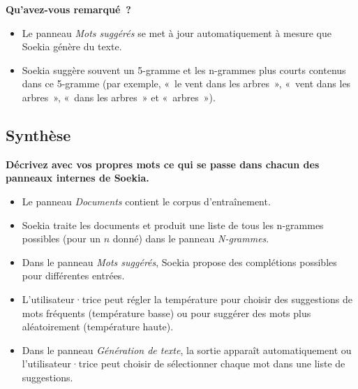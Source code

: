 \documentclass[12pt,a4paper]{article}
\begin{document}
\begin{thinkbox}
  \textbf{Qu'avez-vous remarqué~?}
  \begin{itemize}
    \item Le panneau \emph{Mots suggérés} se met à jour automatiquement à mesure que Soekia génère du texte.
    \item Soekia suggère souvent un 5-gramme et les n-grammes plus courts contenus dans ce 5-gramme (par exemple, «~le vent dans les arbres~», «~vent dans les arbres~», «~dans les arbres~» et «~arbres~»).
  \end{itemize}
\end{thinkbox}

\subsection{Synthèse}

\begin{thinkbox}
  \textbf{Décrivez avec vos propres mots ce qui se passe dans chacun des panneaux internes de Soekia.}
  \begin{itemize}
    \item Le panneau \emph{Documents} contient le corpus d'entraînement.
    \item Soekia traite les documents et produit une liste de tous les n-grammes possibles (pour un $n$ donné) dans le panneau \emph{N-grammes}.
    \item Dans le panneau \emph{Mots suggérés}, Soekia propose des complétions possibles pour différentes entrées.
    \item L'utilisateur·trice peut régler la température pour choisir des suggestions de mots fréquents (température basse) ou pour suggérer des mots plus aléatoirement (température haute).
    \item Dans le panneau \emph{Génération de texte}, la sortie apparaît automatiquement ou l'utilisateur·trice peut choisir de sélectionner chaque mot dans une liste de suggestions.
  \end{itemize}
\end{thinkbox}
\end{document}
